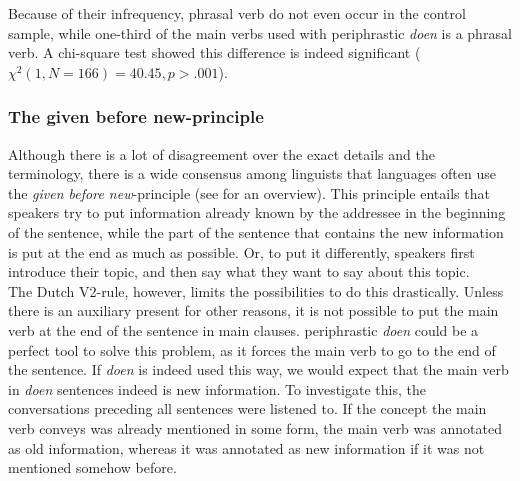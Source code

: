 \documentclass[12pt]{article}
\begin{document}
\begin{table}[h] \footnotesize

\caption{\footnotesize Distribution phrasal verbs versus non-phrasal verbs for the \emph{doen} sentences and the control sentences.}
\end{table}

Because of their infrequency, phrasal verb do not even occur in the control sample, while one-third of the main verbs used with periphrastic \emph{doen} is a phrasal verb. A chi-square test showed this difference is indeed significant ($\chi^2(1, N=166) = 40.45, p > .001$).

\subsubsection{The given before new-principle}

Although there is a lot of disagreement over the exact details and the terminology, there is a wide consensus among linguists that languages often use the \emph{given before new}-principle (see \citet{dsdh95} for an overview). This principle entails that speakers try to put information already known by the addressee in the beginning of the sentence, while the part of the sentence that contains the new information is put at the end as much as possible. Or, to put it differently, speakers first introduce their topic, and then say what they want to say about this topic.\\\indent
The Dutch V2-rule, however, limits the possibilities to do this drastically. Unless there is an auxiliary present for other reasons, it is not possible to put the main verb at the end of the sentence in main clauses. periphrastic \emph{doen} could be a perfect tool to solve this problem, as it forces the main verb to go to the end of the sentence. If \emph{doen} is indeed used this way, we would expect that the main verb in \emph{doen} sentences indeed is new information. To investigate this, the conversations preceding all sentences were listened to. If the concept the main verb conveys was already mentioned in some form, the main verb was annotated as old information, whereas it was annotated as new information if it was not mentioned somehow before.
\end{document}
